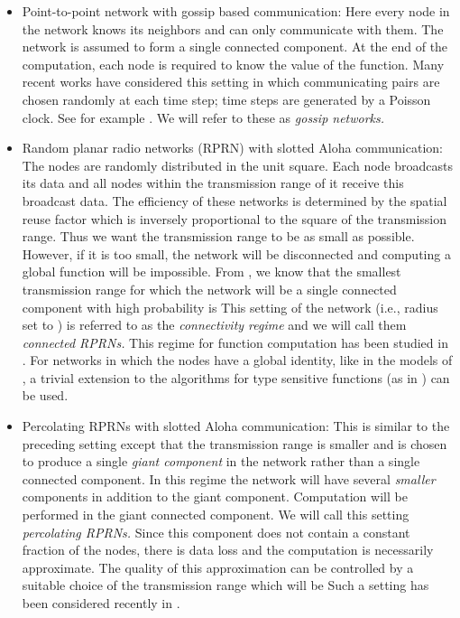 \documentclass[10pt,twosided,a4paper,draft,onecolumn]{article}
\begin{document}
\begin{itemize}
\item Point-to-point network with gossip based communication: Here
  every node in the network knows its neighbors and can only
  communicate with them. The network is assumed to form a single
  connected component. At the end of the computation, each node is
  required to know the value of the function. Many recent works have
  considered this setting in which communicating pairs are chosen
  randomly at each time step; time steps are generated by a Poisson
  clock. See for example \cite{Ayaso08,Boyd05,Mosk-Aoyama06}. We will
  refer to these as \emph{gossip networks.} 
\item Random planar radio networks (RPRN) with slotted Aloha
  communication:  The nodes are randomly distributed in the unit
  square. Each node broadcasts its data and all nodes within the
  transmission range of it receive this broadcast data. The efficiency
  of these networks is determined by the spatial reuse factor which is
  inversely proportional to the square of the transmission range. Thus
  we want the transmission range to be as small as possible. However,
  if it is too small, the network will be disconnected and computing a
  global function will be impossible. From \cite{Gupta00}, we know that the
  smallest transmission range for which the network will be a single
  connected component with high probability is  This setting of the network (i.e.,
  radius set to ) is referred to as the \emph{connectivity
    regime} and we will call them \emph{connected RPRNs.}  This regime
  for function computation has been studied in \cite{Kamath08,
    Giridhar06, Dutta08}. For networks in which the nodes have a
  global identity, like in the models of \cite{Giridhar06}, a trivial
  extension to the algorithms for type sensitive functions (as in
  \cite{Giridhar05}) can be used.

\item Percolating RPRNs with slotted Aloha communication: This is
  similar to the preceding setting except that the transmission range
  is smaller and is chosen to produce a single \emph{giant component}
  in the network rather than a single connected component. In this
  regime the network will have several \emph{smaller} components in
  addition to the giant component. Computation will be performed in
  the giant connected component. We will call this setting
  \emph{percolating RPRNs.} Since this component does not contain a
  constant fraction of the nodes, there is data loss and the
  computation is necessarily approximate. The quality of this
  approximation can be controlled by a suitable choice of the
  transmission range which will be 
  Such a setting has been considered recently in \cite{Iyer11}.
\end{itemize}
\end{document}
